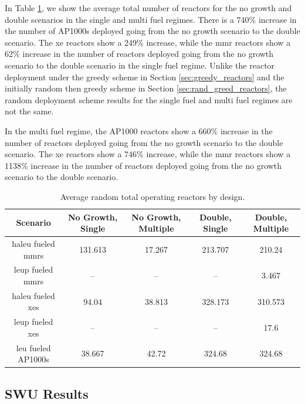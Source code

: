 In Table \ref{tab:random_reac_avg}, we show the average total number of reactors for the no growth and double scenarios in the single and multi fuel regimes. There is a 740\% increase in the number of AP1000s deployed going from the no growth scenario to the double scenario. The \gls{xe} reactors show a 249\% increase, while the \gls{mmr} reactors show a 62\% increase in the number of reactors deployed going from the no growth scenario to the double scenario in the single fuel regime. Unlike the reactor deployment under the greedy scheme in Section \ref{sec:greedy_reactors} and the initially random then greedy scheme in Section \ref{sec:rand_greed_reactors}, the random deployment scheme results for the single fuel and multi fuel regimes are not the same.

In the multi fuel regime, the AP1000 reactors show a 660\% increase in the number of reactors deployed going from the no growth scenario to the double scenario. The \gls{xe} reactors show a 746\% increase, while the \gls{mmr} reactors show a 1138\% increase in the number of reactors deployed going from the no growth scenario to the double scenario.

\begin{table}[H]
    \centering
    \caption{Average random total operating reactors by design.}
    \label{tab:random_reac_avg}
    \begin{tabular}{c c c c c}
       \hline
       Scenario & No Growth, Single & No Growth, Multiple & Double, Single & Double, Multiple  \\
       \hline
       \gls{haleu} fueled \glspl{mmr} & 131.613 & 17.267  & 213.707 & 210.24  \\
       \gls{leup} fueled \glspl{mmr}  & --      & --      & --      & 3.467   \\
       \gls{haleu} fueled \glspl{xe}  & 94.04   & 38.813  & 328.173 & 310.573 \\
       \gls{leup} fueled \glspl{xe}   & --      & --      & --      & 17.6    \\
       \gls{leu} fueled AP1000s       & 38.667  & 42.72   & 324.68  & 324.68  \\
       \hline
    \end{tabular}
\end{table}




\subsection{SWU Results}
\label{sec:random_swu}


